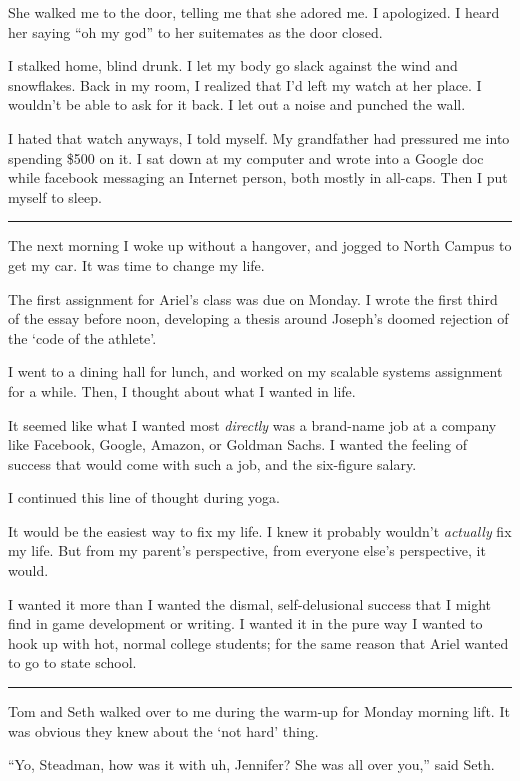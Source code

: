 She walked me to the door, telling me that she adored me.  I apologized.  I
heard her saying ``oh my god'' to her suitemates as the door closed.

I stalked home, blind drunk.  I let my body go slack against the wind and
snowflakes.  Back in my room, I realized that I'd left my watch at her place.  I
wouldn't be able to ask for it back.  I let out a noise and punched the wall.

I hated that watch anyways, I told myself.  My grandfather had pressured me into
spending \$500 on it.   I sat down at my computer and wrote into a Google doc
while facebook messaging an Internet person, both mostly in all-caps.  Then I
put myself to sleep.

\plainfancybreak{12pt}{2}{}

The next morning I woke up without a hangover, and jogged to North Campus to get
my car.  It was time to change my life.

The first assignment for Ariel's class was due on Monday.  I wrote the first
third of the essay before noon, developing a thesis around Joseph's doomed
rejection of the `code of the athlete'.

I went to a dining hall for lunch, and worked on my scalable systems assignment
for a while.  Then, I thought about what I wanted in life.

It seemed like what I wanted most \textit{directly} was a brand-name job at a
company like Facebook, Google, Amazon, or Goldman Sachs.  I wanted the feeling
of success that would come with such a job, and the six-figure salary.

I continued this line of thought during yoga.

It would be the easiest way to fix my life.  I knew it probably wouldn't
\textit{actually} fix my life.  But from my parent's perspective, from everyone
else's perspective, it would.

I wanted it more than I wanted the dismal, self-delusional success that I might
find in game development or writing.  I wanted it in the pure way I wanted to
hook up with hot, normal college students; for the same reason that Ariel
wanted to go to state school.

\plainfancybreak{12pt}{2}{}

Tom and Seth walked over to me during the warm-up for Monday morning lift.  It
was obvious they knew about the `not hard' thing.

``Yo, Steadman, how was it with uh, Jennifer?  She was all over you,'' said
Seth.

